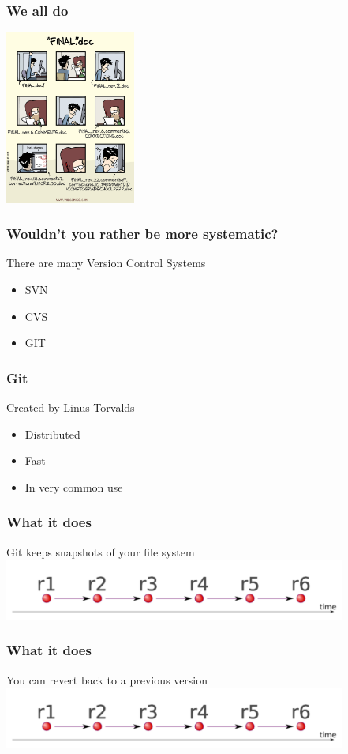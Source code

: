 \documentclass{beamer}
\begin{document}
\begin{frame}
\frametitle{We all do}
 \includegraphics[height=5.7cm]{figures/vcs_for_science.png}
\end{frame}


\begin{frame}
\frametitle{Wouldn't you rather be more systematic?}
There are many Version Control Systems
\begin{itemize}
\pause
\item
SVN
\pause
\item
CVS 
\pause
\item
GIT
\end{itemize}
\end{frame}


\begin{frame}
\frametitle{Git}
Created by Linus Torvalds
\begin{itemize}
\pause
\item
Distributed
\pause
\item
Fast 
\pause
\item
In very common use
\end{itemize}
\end{frame}

\begin{frame}
\frametitle{What it does}
Git keeps snapshots of your file system
\includegraphics[height=2cm]{figures/git1.pdf}
\end{frame}

\begin{frame}
\frametitle{What it does}
You can revert back to a previous version
\includegraphics[height=2cm]{figures/git1.pdf}
\end{frame}
\end{document}
